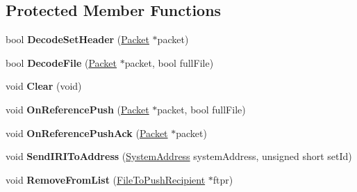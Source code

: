 \subsection*{Protected Member Functions}
\begin{DoxyCompactItemize}
\item 
\hypertarget{class_rak_net_1_1_file_list_transfer_a457c62ffff95264d7812d872d0bceef5}{bool {\bfseries Decode\-Set\-Header} (\hyperlink{struct_rak_net_1_1_packet}{Packet} $\ast$packet)}\label{class_rak_net_1_1_file_list_transfer_a457c62ffff95264d7812d872d0bceef5}

\item 
\hypertarget{class_rak_net_1_1_file_list_transfer_a3e270c94724f70e8bda217c622281c68}{bool {\bfseries Decode\-File} (\hyperlink{struct_rak_net_1_1_packet}{Packet} $\ast$packet, bool full\-File)}\label{class_rak_net_1_1_file_list_transfer_a3e270c94724f70e8bda217c622281c68}

\item 
\hypertarget{class_rak_net_1_1_file_list_transfer_a3ded31bbab3c189dc36b2b2afb41d1ff}{void {\bfseries Clear} (void)}\label{class_rak_net_1_1_file_list_transfer_a3ded31bbab3c189dc36b2b2afb41d1ff}

\item 
\hypertarget{class_rak_net_1_1_file_list_transfer_a5c43793266ad2c18ccf70c56e179e549}{void {\bfseries On\-Reference\-Push} (\hyperlink{struct_rak_net_1_1_packet}{Packet} $\ast$packet, bool full\-File)}\label{class_rak_net_1_1_file_list_transfer_a5c43793266ad2c18ccf70c56e179e549}

\item 
\hypertarget{class_rak_net_1_1_file_list_transfer_afa5cb46c89d9782f5673aff7e424e6da}{void {\bfseries On\-Reference\-Push\-Ack} (\hyperlink{struct_rak_net_1_1_packet}{Packet} $\ast$packet)}\label{class_rak_net_1_1_file_list_transfer_afa5cb46c89d9782f5673aff7e424e6da}

\item 
\hypertarget{class_rak_net_1_1_file_list_transfer_afe9c46fa9ea37cdb71efbb698b82dee4}{void {\bfseries Send\-I\-R\-I\-To\-Address} (\hyperlink{struct_rak_net_1_1_system_address}{System\-Address} system\-Address, unsigned short set\-Id)}\label{class_rak_net_1_1_file_list_transfer_afe9c46fa9ea37cdb71efbb698b82dee4}

\item 
\hypertarget{class_rak_net_1_1_file_list_transfer_adc2b6f61955a9b51f503f53eb58638e1}{void {\bfseries Remove\-From\-List} (\hyperlink{struct_rak_net_1_1_file_list_transfer_1_1_file_to_push_recipient}{File\-To\-Push\-Recipient} $\ast$ftpr)}\label{class_rak_net_1_1_file_list_transfer_adc2b6f61955a9b51f503f53eb58638e1}

\end{DoxyCompactItemize}
